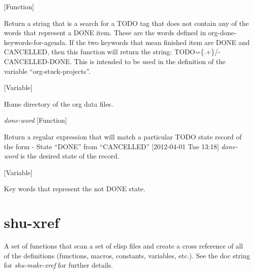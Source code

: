 \vspace{1em}
\noindent
{}
\usebox{\funcname}
 \hfill [Function]

\begin{doc-string}
Return a string that is a search for a TODO tag that does not contain any of the
words that represent a DONE item.  These are the words defined in org-done-keywords-for-agenda.
If the two keywords that mean finished item are DONE and CANCELLED, then this function will
return the string: TODO=\{.+\}/-CANCELLED-DONE.  This is intended to be used in the definition
of the variable ``org-stuck-projects''.
\end{doc-string}

\vspace{1em}
\noindent
{}
\usebox{\funcname}
 \hfill [Variable]

\begin{doc-string}
Home directory of the org data files.
\end{doc-string}

\vspace{1em}
\noindent
{}
\usebox{\funcname}\emph{done-word}
 \hfill [Function]

\begin{doc-string}
Return a regular expression that will match a particular TODO state record of the form
   - State ``DONE''       from ``CANCELLED''  [2012-04-01 Tue 13:18]
  \emph{done-word} is the desired state of the record.
\end{doc-string}

\vspace{1em}
\noindent
{}
\usebox{\funcname}
 \hfill [Variable]

\begin{doc-string}
Key words that represent the not DONE state.
\end{doc-string}

\eject
\section{shu-xref}



A set of functions that scan a set of elisp files and create a cross reference
of all of the definitions (functions, macros, constants, variables, etc.).
See the doc string for \emph{shu-make-xref} for further details.


